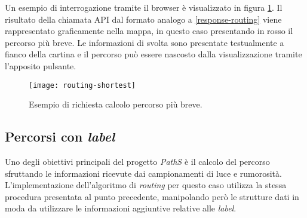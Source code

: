 Un esempio di interrogazione tramite il browser è visualizzato in figura \ref{fig:routing-shortest}. Il risultato della chiamata API dal formato analogo a \ref{response-routing} viene rappresentato graficamente nella mappa, in questo caso presentando in rosso il percorso più breve. Le informazioni di svolta sono presentate testualmente a fianco della cartina e il percorso può essere nascosto dalla visualizzazione tramite l'apposito pulsante.

\begin{figure}[ht]
  \centering
  \texttt{[image: routing-shortest]}
  \caption{\footnotesize{Esempio di richiesta calcolo percorso più breve.}}
  \label{fig:routing-shortest}
\end{figure}

\subsection{Percorsi con \emph{label}}
Uno degli obiettivi principali del progetto \emph{PathS} è il calcolo del percorso sfruttando le informazioni ricevute dai campionamenti di luce e rumorosità. L'implementazione dell'algoritmo di \emph{routing} per questo caso utilizza la stessa procedura presentata al punto precedente, manipolando però le strutture dati in moda da utilizzare le informazioni aggiuntive relative alle \emph{label}.

